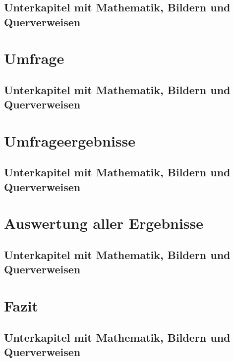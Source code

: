 \section{Unterkapitel mit Mathematik, Bildern und Querverweisen}

\chapter{Umfrage}

\section{Unterkapitel mit Mathematik, Bildern und Querverweisen}

\chapter{Umfrageergebnisse}

\section{Unterkapitel mit Mathematik, Bildern und Querverweisen}

\chapter{Auswertung aller Ergebnisse}

\section{Unterkapitel mit Mathematik, Bildern und Querverweisen}

\chapter{Fazit}

\section{Unterkapitel mit Mathematik, Bildern und Querverweisen}






\listoffigures %
\listoftables %



